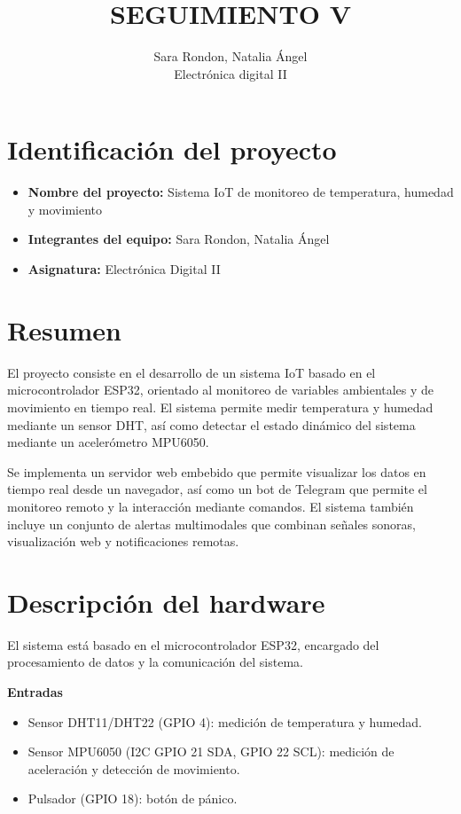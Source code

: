 \documentclass[12pt]{article}
\title{SEGUIMIENTO V}
\author{Sara Rondon, Natalia Ángel\\ Electrónica digital II}
\date{}
\begin{document}
\maketitle
\tableofcontents
\newpage

\section{Identificación del proyecto}
\begin{itemize}
    \item \textbf{Nombre del proyecto:} Sistema IoT de monitoreo de temperatura, humedad y movimiento
    \item \textbf{Integrantes del equipo:} Sara Rondon, Natalia Ángel
    \item \textbf{Asignatura:} Electrónica Digital II
\end{itemize}

\section{Resumen}
El proyecto consiste en el desarrollo de un sistema IoT basado en el microcontrolador ESP32, orientado al monitoreo de variables ambientales y de movimiento en tiempo real. El sistema permite medir temperatura y humedad mediante un sensor DHT, así como detectar el estado dinámico del sistema mediante un acelerómetro MPU6050.

Se implementa un servidor web embebido que permite visualizar los datos en tiempo real desde un navegador, así como un bot de Telegram que permite el monitoreo remoto y la interacción mediante comandos. El sistema también incluye un conjunto de alertas multimodales que combinan señales sonoras, visualización web y notificaciones remotas.

\section{Descripción del hardware}

El sistema está basado en el microcontrolador ESP32, encargado del procesamiento de datos y la comunicación del sistema.

\textbf{Entradas}
\begin{itemize}
    \item Sensor DHT11/DHT22 (GPIO 4): medición de temperatura y humedad.
    \item Sensor MPU6050 (I2C GPIO 21 SDA, GPIO 22 SCL): medición de aceleración y detección de movimiento.
    \item Pulsador (GPIO 18): botón de pánico.
\end{itemize}
\end{document}
